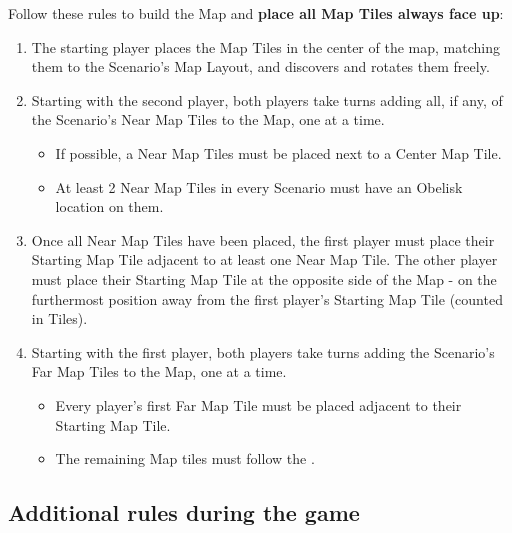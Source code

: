 \begin{multicols*}{2}
Follow these rules to build the Map and \textbf{place all Map Tiles always face up}:
\begin{enumerate}
    \item The starting player places the Map Tiles in the center of the map, matching them to the Scenario's Map Layout, and discovers and rotates them freely.
    \item Starting with the second player, both players take turns adding all, if any, of the Scenario's Near Map Tiles to the Map, one at a time.
    \begin{itemize}
        \item If possible, a Near Map Tiles must be placed next to a Center Map Tile.
        \item At least 2 Near Map Tiles in every Scenario must have an Obelisk location on them.
    \end{itemize}
    \item Once all Near Map Tiles have been placed, the first player must place their Starting Map Tile adjacent to at least one Near Map Tile.
    The other player must place their Starting Map Tile at the opposite side of the Map - on the furthermost position away from the first player's Starting Map Tile (counted in Tiles).
    \item Starting with the first player, both players take turns adding the Scenario's Far Map Tiles to the Map, one at a time.
    \begin{itemize}
        \item Every player's first Far Map Tile must be placed adjacent to their Starting Map Tile.
        \item The remaining Map tiles must follow the .
    \end{itemize}
\end{enumerate}

\subsection*{Additional rules during the game}


\end{multicols*}
